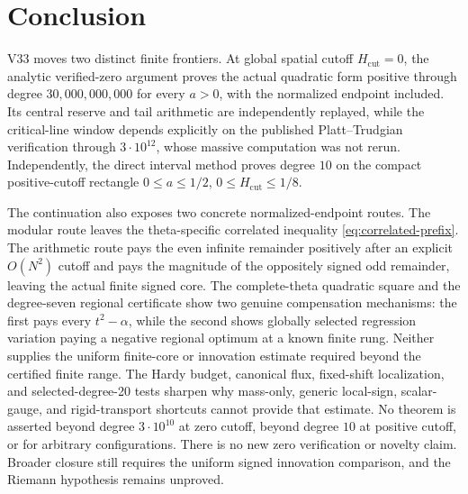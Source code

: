\documentclass[11pt]{article}
\theoremstyle{definition}
\theoremstyle{remark}
\begin{document}
\section*{Conclusion}

V33 moves two distinct finite frontiers. At global spatial cutoff
$H_{\mathrm{cut}}=0$, the analytic verified-zero argument proves the actual
quadratic form positive through degree $30{,}000{,}000{,}000$ for every
$a>0$, with the normalized endpoint included. Its central reserve and tail
arithmetic are independently replayed, while the critical-line window depends
explicitly on the published Platt--Trudgian verification through
$3\cdot10^{12}$, whose massive computation was not rerun. Independently, the
direct interval method proves degree $10$ on the compact positive-cutoff
rectangle $0\le a\le1/2$, $0\le H_{\mathrm{cut}}\le1/8$.

The continuation also exposes two concrete normalized-endpoint routes. The
modular route leaves the theta-specific correlated inequality
\eqref{eq:correlated-prefix}. The arithmetic route pays the even infinite
remainder positively after an explicit $O(N^2)$ cutoff and pays the magnitude
of the oppositely signed odd remainder, leaving the actual finite signed core.
The complete-theta quadratic square and the degree-seven regional certificate
show two genuine compensation mechanisms: the first pays every
$t^2-\alpha$, while the second shows globally selected regression variation
paying a negative regional optimum at a known finite rung. Neither supplies
the uniform finite-core or innovation estimate required beyond the certified
finite range. The Hardy budget, canonical flux, fixed-shift localization, and
selected-degree-20 tests sharpen why mass-only, generic local-sign, scalar-gauge,
and rigid-transport shortcuts cannot provide that estimate. No theorem is
asserted beyond degree $3\cdot10^{10}$ at zero cutoff, beyond degree $10$ at
positive cutoff, or for arbitrary configurations. There is no new zero
verification or novelty claim. Broader closure still requires the uniform
signed innovation comparison, and the Riemann hypothesis remains unproved.



\end{document}
